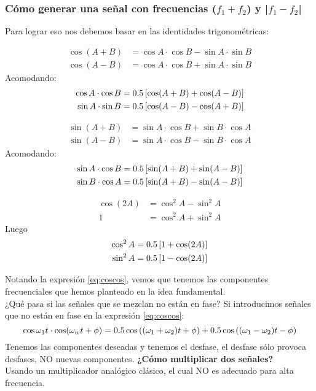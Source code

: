 \documentclass[
	12pt, %
	fleqn, %
	a4paper, %
	oneside, %
]{LegrandOrangeBook}
\begin{document}
\subsubsection*{Cómo generar una señal con frecuencias ($f_1+f_2$) y |$f_1-f_2$|}
Para lograr eso nos debemos basar en las identidades trigonométricas:
\begin{theorem}
\begin{align}
\cos(A+B)&=\cos A\cdot\cos B-\sin A\cdot\sin B\\
\cos(A-B)&=\cos A\cdot\cos B+\sin A\cdot\sin B
\end{align}
Acomodando:
\begin{align}
\cos A\cdot\cos B&=0.5\left[\cos(A+B)+\cos(A-B)\right]\label{eq:coscos}\\
\sin A\cdot\sin B&=0.5\left[\cos(A-B)-\cos(A+B)\right]\label{eq:sensen}
\end{align}
\end{theorem}
\begin{theorem}
\begin{align}
\sin(A+B)&=\sin A\cdot\cos B+\sin B\cdot\cos A\\
\sin(A-B)&=\sin A\cdot\cos B-\sin B\cdot\cos A
\end{align}
Acomodando:
\begin{align}
\sin A\cdot\cos B&=0.5\left[\sin(A+B)+\sin(A-B)\right]\label{eq:sencon}\\
\sin B\cdot\cos A&=0.5\left[\sin(A+B)-\sin(A-B)\right]\label{eq:cossen}
\end{align}
\end{theorem}
\begin{theorem}
\begin{align}
\cos(2A)&=\cos^2A-\sin^2A\\
1&=\cos^2A+\sin^2A
\end{align}
Luego
\begin{align}
\cos^2A&=0.5\left[1+\cos(2A)\right]\label{eq:coscuadrado}\\
\sin^2A&=0.5\left[1-\cos(2A)\right]\label{eq:sincuadrado}
\end{align}
\end{theorem}
Notando la expresión \ref{eq:coscos}, vemos que tenemos las componentes frecuenciales que hemos planteado en la idea fundamental.\\
¿Qué pasa si las señales que se mezclan no están en fase? Si introducimos señales que no están en fase en la expresión \ref{eq:coscos}:
\begin{displaymath}
\cos\omega_1t\cdot\cos(\omega_wt+\phi)=0.5\cos\left((\omega_1+\omega_2)t+\phi\right)+0.5\cos\left((\omega_1-\omega_2)t-\phi\right)
\end{displaymath}
Tenemos las componentes deseadas y tenemos el desfase, el desfase sólo provoca desfases, NO nuevas componentes.
\textbf{¿Cómo multiplicar dos señales?}\\
Usando un multiplicador analógico clásico, el cual NO es adecuado para alta frecuencia.
\end{document}
